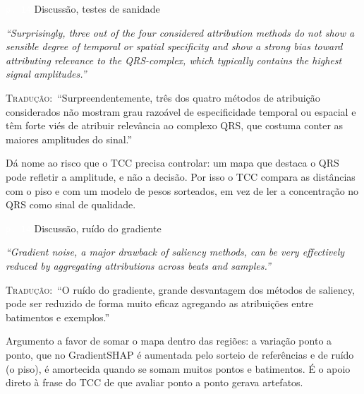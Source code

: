 \documentclass[11pt,a4paper]{article}
\newcommand{\pagechip}[1]{{\setlength{\fboxsep}{1.5pt}\colorbox{cAcc}{\textcolor{white}{\scriptsize\texttt{#1}}}}}
\newenvironment{origquote}{\par\itshape\small}{\par}
\newenvironment{tradquote}{\par\small\textsc{Tradução:}\ }{\par}
\newcommand{\explab}[1]{\par\smallskip{\small\color{cAcc}\textbf{\MakeUppercase{#1}}}\par}
\begin{document}
\begin{citacard}{\pagechip{p. 14} Discussão, testes de sanidade}
\begin{origquote}“Surprisingly, three out of the four considered attribution methods do not show a sensible degree of temporal or spatial specificity and show a strong bias toward attributing relevance to the QRS-complex, which typically contains the highest signal amplitudes.”\end{origquote}
\begin{tradquote}“Surpreendentemente, três dos quatro métodos de atribuição considerados não mostram grau razoável de especificidade temporal ou espacial e têm forte viés de atribuir relevância ao complexo QRS, que costuma conter as maiores amplitudes do sinal.”\end{tradquote}
\explab{Explicação}
Dá nome ao risco que o TCC precisa controlar: um mapa que destaca o QRS pode refletir a amplitude, e não a decisão. Por isso o TCC compara as distâncias com o piso e com um modelo de pesos sorteados, em vez de ler a concentração no QRS como sinal de qualidade.
\end{citacard}

\begin{citacard}{\pagechip{p. 14} Discussão, ruído do gradiente}
\begin{origquote}“Gradient noise, a major drawback of saliency methods, can be very effectively reduced by aggregating attributions across beats and samples.”\end{origquote}
\begin{tradquote}“O ruído do gradiente, grande desvantagem dos métodos de saliency, pode ser reduzido de forma muito eficaz agregando as atribuições entre batimentos e exemplos.”\end{tradquote}
\explab{Explicação}
Argumento a favor de somar o mapa dentro das regiões: a variação ponto a ponto, que no GradientSHAP é aumentada pelo sorteio de referências e de ruído (o piso), é amortecida quando se somam muitos pontos e batimentos. É o apoio direto à frase do TCC de que avaliar ponto a ponto gerava artefatos.
\end{citacard}
\end{document}
